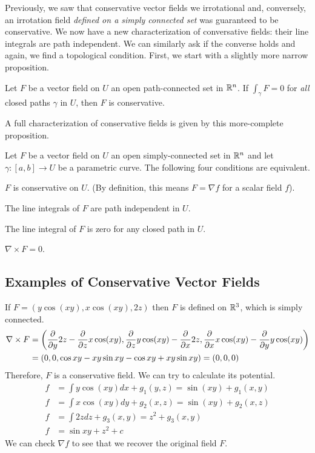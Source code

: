 \documentclass[fleqn,letterpaper]{report}
\begin{document}
Previously, we saw that conservative vector fields we
irrotational and, conversely, an irrotation field
\emph{defined on a simply connected set} was guaranteed to be
conservative. We now have a new characterization of
conversative fields: their line integrals are path
independent. We can similarly ask if the converse holds and
again, we find a topological condition. First, we start with a
slightly more narrow proposition.
\begin{prop}
Let $F$ be a vector field on $U$ an open path-connected set in
$\mathbb{R}^n$. If $\int_{\gamma} F = 0$ for \emph{all} closed
paths $\gamma$ in $U$, then $F$ is conservative. 
\end{prop}

A full characterization of conservative fields is given by
this more-complete proposition.

\begin{prop}
Let $F$ be a vector field on $U$ an open simply-connected set
in $\mathbb{R}^n$ and let $\gamma: [a,b] \rightarrow U$ be a
parametric curve. The following four conditions are
equivalent.
\begin{smallparts}
\item $F$ is conservative on $U$. (By
definition, this means $F = \nabla f$ for a scalar field $f$).
\item The line integrals of $F$ are path independent in $U$.
\item The line integral of $F$ is zero for any closed path in
$U$.
\item $\nabla \times F = 0$.
\end{smallparts}
\end{prop}

\subsection{Examples of Conservative Vector Fields}
\label{conservative-examples}

\begin{example}
If $F = (y \cos (xy), x \cos (xy), 2z)$ then $F$ is defined on
$\mathbb{R}^3$, which is simply connected.
\begin{align*}
\nabla \times F & = \left( \frac{\partial}{\partial y} 2z -
\frac{\partial}{\partial z} x \cos (xy), \frac{\partial}{\partial z} y \cos
(xy) - \frac{\partial}{\partial x} 2z, \frac{\partial}{\partial x} x \cos (xy)
- \frac{\partial}{\partial y} y \cos (xy) \right) \\
& = (0, 0, \cos xy - xy \sin xy - \cos xy + xy \sin xy) =
(0,0,0)
\end{align*}
Therefore, $F$ is a conservative field. We can try to
calculate its potential.
\begin{align*}
f & = \int y \cos (xy) dx + g_1(y,z) = \sin (xy) + g_1(x,y) \\
f & = \int x \cos (xy) dy + g_2(x,z) = \sin (xy) + g_2(x,z) \\
f & = \int 2z dz + g_3(x,y) = z^2 + g_3(x,y) \\
f & = \sin xy + z^2 + c
\end{align*}
We can check $\nabla f$ to see that we recover the original
field $F$. 
\end{example}
\end{document}
